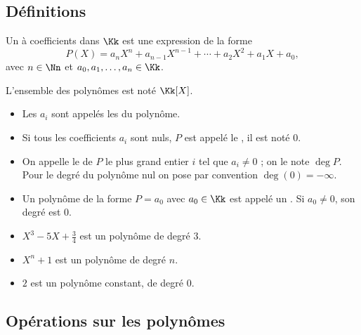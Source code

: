\documentclass[class=report,crop=false]{standalone}
\begin{document}
\subsection{Définitions}


\begin{definition}
Un  à coefficients dans $\Kk$
est une expression de la forme
$$P(X) = a_n X^n + a_{n-1} X^{n-1} + \cdots + a_2 X^2 + a_1 X + a_0,$$
avec $n\in \Nn$ et $a_0,a_1,\ldots,a_n \in \Kk$.

L'ensemble des polynômes est noté $\Kk[X]$.

\begin{itemize}
\item Les $a_i$ sont appelés les  du polynôme.

\item Si tous les coefficients $a_i$ sont nuls, $P$ est appelé le , il est noté $0$.

\item  On appelle le  de $P$ le plus grand entier $i$ tel que $a_i\neq0$ ;
on le note $\deg P$. Pour le degré du polynôme nul on pose par convention $\deg(0)=-\infty$.

\item Un polynôme de la forme $P=a_0$ avec $a_0\in\Kk$ est appelé un
  . Si $a_0\neq0$, son degré est $0$.
\end{itemize}
\end{definition}

\begin{exemple}
\sauteligne
\begin{itemize}
  \item $X^3-5X+\frac 34$ est un polynôme de degré $3$.
  \item $X^n+1$ est un polynôme de degré $n$.
  \item $2$ est un polynôme constant, de degré $0$.
\end{itemize}
\end{exemple}


\subsection{Opérations sur les polynômes}
\end{document}
